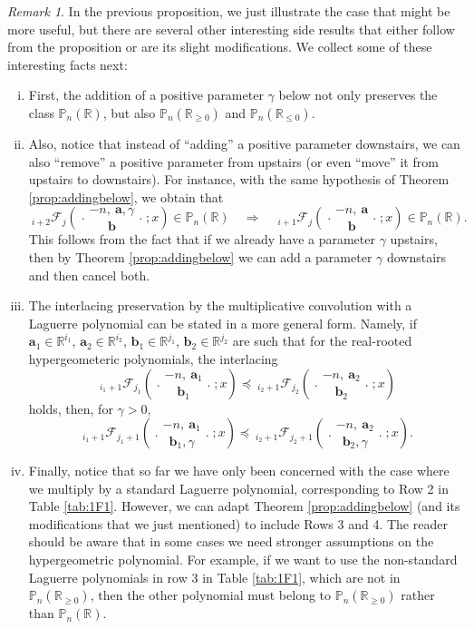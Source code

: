 \documentclass[reqno,11pt]{amsart}
\theoremstyle{remark}
\newtheorem{remark}[theorem]{Remark}
\renewcommand{\P}{\mathbb{P}}
\newcommand{\R}{\mathbb{R}}
\newcommand{\rr}{\mathbb{R}}
\newcommand*\pFq[5]{%
 {\ }_{#1}{\mathcal F}_{#2}{\left(\genfrac..{0pt}{}{#3}{#4};#5\right)}%
}
\begin{document}
\begin{remark}
\label{rem:addingbelow}
In the previous proposition, we just illustrate the case that might be more useful, but there are several other interesting side results that either follow from the proposition or are its slight modifications. We collect some of these interesting facts next:
\begin{enumerate}[(i)]
\item First, the addition of a positive parameter $\gamma$ below not only preserves the class $\P_n(\rr)$, but also $\P_n(\rr_{\geq 0})$ and $\P_n(\rr_{\leq 0})$. 

\item Also, notice that instead of ``adding'' a positive parameter downstairs, we can also ``remove'' a positive parameter from upstairs (or even ``move'' it from upstairs to downstairs). For instance, with the same hypothesis of Theorem \ref{prop:addingbelow}, we obtain that
    \begin{equation}
        \label{addingAbove}
    \pFq{i+2}{j}{-n,\ \bm a, \gamma}{ \bm b }{x} \in \P_n(\R) \quad \Longrightarrow \quad 
    \pFq{i+1}{j}{-n,\ \bm a}{ \bm b}{x} \in \P_n(\R).
    \end{equation}
This follows from the fact that if we already have a parameter $\gamma$ upstairs, then by Theorem \ref{prop:addingbelow} we can add a parameter $\gamma$ downstairs and then cancel both. 

\item  The interlacing preservation by the multiplicative convolution with a Laguerre polynomial can be stated in a more general form. Namely, if $\bm a_1\in \R^{i_1}$, $\bm a_2\in \R^{i_2}$, $\bm b_1 \in \R^{j_1}$, $\bm b_2 \in \R^{j_2}$  are such that for the real-rooted hypergeometeric polynomials, the interlacing 
$$\pFq{i_1+1}{j_1}{-n,\ \bm a_1}{ \bm b_1}{x} \preccurlyeq \pFq{i_2+1}{j_2}{-n,\ \bm a_2}{ \bm b_2}{x} $$ 
holds, then, for $\gamma>0$,
$$
\pFq{i_1+1}{j_1+1}{-n,\ \bm a_1}{ \bm b_1, \gamma}{x} \preccurlyeq \pFq{i_2+1}{j_2+1}{-n,\ \bm a_2}{ \bm b_2, \gamma}{x}.
$$


\item Finally, notice that so far we have only been concerned with the case where we multiply by a standard Laguerre polynomial, corresponding to Row 2 in Table \ref{tab:1F1}. However, we can adapt Theorem \ref{prop:addingbelow} (and its modifications that we just mentioned) to include Rows 3 and 4. The reader should be aware that in some cases we need stronger assumptions on the hypergeometric polynomial. For example, if we want to use the non-standard Laguerre polynomials in row 3 in Table \ref{tab:1F1}, which are not in $\P_n(\R_{\geq 0})$, then the other polynomial must belong to $\P_n(\R_{\geq 0})$ rather than $\P_n(\R)$.
\end{enumerate}
\end{remark}
\end{document}
